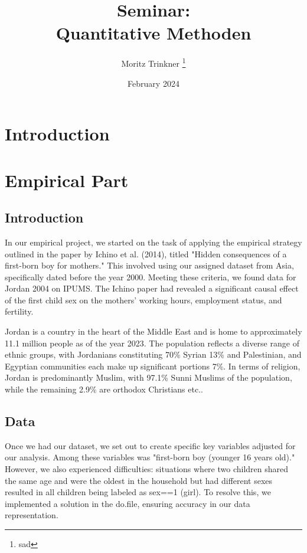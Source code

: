 \documentclass[12pt,draft,a4paper]{article}
\begin{document}
    
\begin{titlepage}

    \author{Moritz Trinkner \thanks {sad }}
    \title{Seminar:\\ Quantitative Methoden}
    \date{February 2024}
\end{titlepage}
\maketitle
\thispagestyle{empty}
\newpage
\tableofcontents
\thispagestyle{empty}
\newpage
\setcounter{page}{1}

\section{Introduction}

\newpage
\section{Empirical Part}
\subsection{Introduction} 

In our empirical project, we started on the task of applying the empirical strategy outlined in the paper by Ichino et al. (2014), 
titled "Hidden consequences of a first-born boy for mothers." 
This involved using our assigned dataset from Asia, specifically dated before the year 2000. Meeting these criteria, we found data for Jordan 2004 on IPUMS. 
The Ichino paper had revealed a significant causal effect of the first child sex on the mothers' working hours, employment status, and fertility.

Jordan is a country in the heart of the Middle East and is home to approximately 11.1 million people as of the year 2023. 
The population reflects a diverse range of ethnic groups, with Jordanians constituting 70\% Syrian 13\% and Palestinian, and Egyptian communities each make up significant portions 7\%. 
In terms of religion, Jordan is predominantly Muslim, with 97.1\% Sunni Muslims of the population, while the remaining 2.9\% are orthodox Christians etc..


\subsection{Data}

Once we had our dataset, we set out to create specific key variables adjusted for our analysis. 
Among these variables was "first-born boy (younger 16 years old)." 
However, we also experienced difficulties: 
situations where two children shared the same age and were the oldest in the household but had different sexes resulted in all children being labeled as sex==1 (girl). 
To resolve this, we implemented a solution in the do.file, ensuring accuracy in our data representation.
\end{document}
